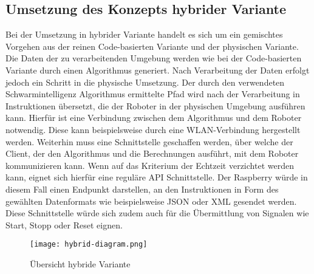 \subsection{Umsetzung des Konzepts hybrider Variante}
Bei der Umsetzung in hybrider Variante handelt es sich um ein gemischtes Vorgehen aus der reinen Code-basierten Variante und der physischen Variante. Die Daten der zu verarbeitenden Umgebung werden wie bei der Code-basierten Variante durch einen Algorithmus generiert. Nach Verarbeitung der Daten erfolgt jedoch ein Schritt in die physische Umsetzung. Der durch den verwendeten Schwarmintelligenz Algorithmus ermittelte Pfad wird nach der Verarbeitung in Instruktionen übersetzt, die der Roboter in der physischen Umgebung ausführen kann. Hierfür ist eine Verbindung zwischen dem Algorithmus und dem Roboter notwendig. Diese kann beispielsweise durch eine WLAN-Verbindung hergestellt werden. Weiterhin muss eine Schnittstelle geschaffen werden, über welche der Client, der den Algorithmus und die Berechnungen ausführt, mit dem Roboter kommunizieren kann. Wenn auf das Kriterium der Echtzeit verzichtet werden kann, eignet sich hierfür eine reguläre API Schnittstelle. Der Raspberry würde in diesem Fall einen Endpunkt darstellen, an den Instruktionen in Form des gewählten Datenformats wie beispielsweise JSON oder XML gesendet werden. Diese Schnittstelle würde sich zudem auch für die Übermittlung von Signalen wie Start, Stopp oder Reset eignen.
\begin{figure}[H]
    \centering
    \texttt{[image: hybrid-diagram.png]}
    \caption{Übersicht hybride Variante}
    \label{fig:overview-hybrid}
\end{figure}

